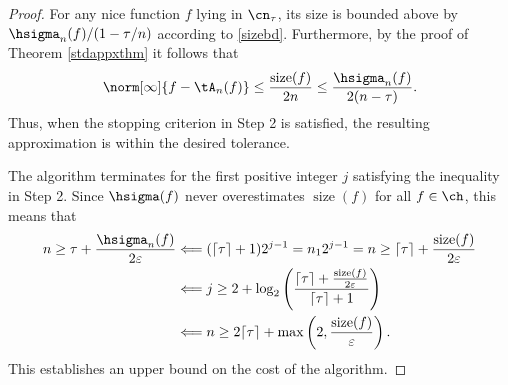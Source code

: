 \documentclass[12pt]{amsart}
\DeclareMathOperator{\size}{size}
\begin{document}
\begin{proof}  For any nice function $f$ lying in $\cn_\tau$, its size is bounded above by $\hsigma_n(f)/(1-\tau/n)$ according to \eqref{sizebd}.  Furthermore, by the proof of Theorem \ref{stdappxthm} it follows that 
\[
\norm[\infty]{f - \tA_n(f)} \le \frac{\size(f)}{2n} \le \frac{\hsigma_n(f)}{2(n-\tau)}.
\]
Thus, when the stopping criterion in Step 2 is satisfied, the resulting approximation is within the desired tolerance.

The algorithm terminates for the first positive integer $j$ satisfying the inequality in Step 2.  Since $\hsigma(f)$ never overestimates $\size(f)$ for all $f \in \ch$, this means that
\begin{align*}
n \ge \tau + \frac{\hsigma_n(f)}{2 \varepsilon} 
& \Longleftarrow (\lceil \tau \rceil + 1 ) 2^{j-1} = n_1 2^{j-1} = n \ge \lceil \tau \rceil + \frac{\size(f)}{2 \varepsilon} \\
& \Longleftarrow j \ge 2 +  \log_2\left(\frac{\lceil \tau \rceil + \frac{\size(f)}{2 \varepsilon}} {\lceil \tau \rceil + 1} \right) \\
& \Longleftarrow n \ge 2 \lceil \tau \rceil + \max\left(2,\frac{\size(f)}{\varepsilon} \right).
\end{align*}
This establishes an upper bound on the cost of the algorithm.


\end{proof}
\end{document}
